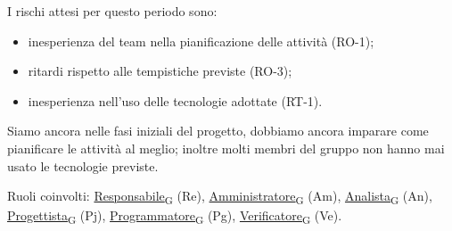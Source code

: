 I rischi attesi per questo periodo sono:
\begin{itemize}
	\item inesperienza del team nella pianificazione delle attività (RO-1);
	\item ritardi rispetto alle tempistiche previste (RO-3);
	\item inesperienza nell'uso delle tecnologie adottate (RT-1).
\end{itemize}
Siamo ancora nelle fasi iniziali del progetto, dobbiamo ancora imparare come pianificare le attività al meglio; inoltre molti membri del gruppo non hanno mai usato le tecnologie previste.

Ruoli coinvolti: \href{https://7last.github.io/docs/pb/documentazione-interna/glossario\#responsabile}{Responsabile\textsubscript{G}} (Re), \href{https://7last.github.io/docs/pb/documentazione-interna/glossario\#amministratore}{Amministratore\textsubscript{G}} (Am), \href{https://7last.github.io/docs/pb/documentazione-interna/glossario\#analista}{Analista\textsubscript{G}} (An), \href{https://7last.github.io/docs/pb/documentazione-interna/glossario\#progettista}{Progettista\textsubscript{G}} (Pj), \href{https://7last.github.io/docs/pb/documentazione-interna/glossario\#programmatore}{Programmatore\textsubscript{G}} (Pg), \href{https://7last.github.io/docs/pb/documentazione-interna/glossario\#verificatore}{Verificatore\textsubscript{G}} (Ve).

